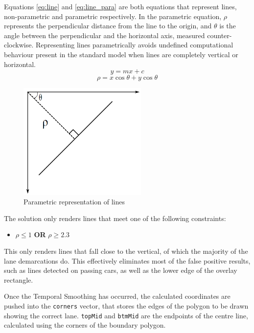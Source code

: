 \documentclass[conference]{IEEEtran}
\begin{document}
Equations \ref{eq:line} and \ref{eq:line_para} are both equations that represent lines, non-parametric and parametric respectively. In the parametric equation, $\rho$ represents the perpendicular distance from the line to the origin, and $\theta$ is the angle between the perpendicular and the horizontal axis, measured counter-clockwise\cite{HoughRT}. Representing lines parametrically avoids undefined computational behaviour present in the standard model when lines are completely vertical or horizontal. 
\begin{equation}\label{eq:line}
y = mx + c
\end{equation}
\begin{equation}\label{eq:line_para}
\rho = x \cos\theta + y \cos\theta
\end{equation}

\begin{figure}[H]
\centering
\includegraphics[width=2.5in]{t5_rhotheta}
\caption{Parametric representation of lines\cite{HoughRT}}
\label{fig:t5proc}
\end{figure}

The solution only renders lines that meet one of the following constraints: \begin{itemize}
\item[] $\rho \leq 1$ \textbf{OR} $\rho \geq 2.3$
\end{itemize} This only renders lines that fall close to the vertical, of which the majority of the lane demarcations do. This effectively eliminates most of the false positive results, such as lines detected on passing cars, as well as the lower edge of the overlay rectangle.

Once the Temporal Smoothing has occurred, the calculated coordinates are pushed into the \verb|corners| vector, that stores the edges of the polygon to be drawn showing the correct lane. \verb|topMid| and \verb|btmMid| are the endpoints of the centre line, calculated using the corners of the boundary polygon.
\end{document}
